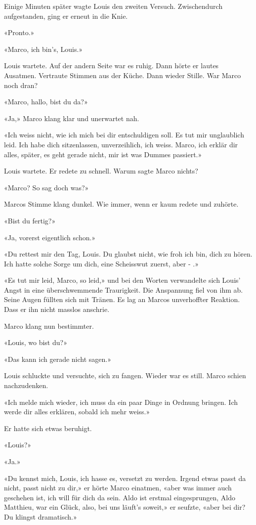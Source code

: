 Einige Minuten später wagte Louis den zweiten Versuch. Zwischendurch
aufgestanden, ging er erneut in die Knie.

\sectionbreak

«Pronto.»

«Marco, ich bin’s, Louis.»

Louis wartete. Auf der andern Seite war es ruhig. Dann hörte er lautes
Ausatmen. Vertraute Stimmen aus der Küche. Dann wieder Stille. War Marco
noch dran?

«Marco, hallo, bist du da?»

«Ja,» Marco klang klar und unerwartet nah.

«Ich weiss nicht, wie ich mich bei dir entschuldigen soll. Es tut mir
unglaublich leid. Ich habe dich sitzenlassen, unverzeihlich, ich weiss.
Marco, ich erklär dir alles, später, es geht gerade nicht, mir ist was
Dummes passiert.»

Louis wartete. Er redete zu schnell. Warum sagte Marco nichts?

«Marco? So sag doch was?»

Marcos Stimme klang dunkel. Wie immer, wenn er kaum redete und zuhörte.

«Bist du fertig?»

«Ja, vorerst eigentlich schon.»

«Du rettest mir den Tag, Louis. Du glaubst nicht, wie froh ich bin, dich
zu hören. Ich hatte solche Sorge um dich, eine Scheisswut zuerst, aber - .»

«Es tut mir leid, Marco, so leid,» und bei den Worten verwandelte sich
Louis’ Angst in eine überschwemmende Traurigkeit. Die Anspannung fiel
von ihm ab. Seine Augen füllten sich mit Tränen. Es lag an Marcos
unverhoffter Reaktion. Dass er ihn nicht masslos anschrie.

Marco klang nun bestimmter.

«Louis, wo bist du?»

«Das kann ich gerade nicht sagen.»

Louis schluckte und versuchte, sich zu fangen. Wieder war es still.
Marco schien nachzudenken.

«Ich melde mich wieder, ich muss da ein paar Dinge in Ordnung bringen.
Ich werde dir alles erklären, sobald ich mehr weiss.»

Er hatte sich etwas beruhigt.

«Louis?»

«Ja.»

«Du kennst mich, Louis, ich hasse es, versetzt zu werden. Irgend etwas
passt da nicht, passt nicht zu dir,» er hörte Marco einatmen, «aber was immer
auch geschehen ist, ich will für dich da sein. Aldo ist erstmal
eingesprungen, Aldo Matthieu, war ein Glück, also, bei uns läuft’s
soweit,» er seufzte, «aber bei dir? Du klingst dramatisch.»

